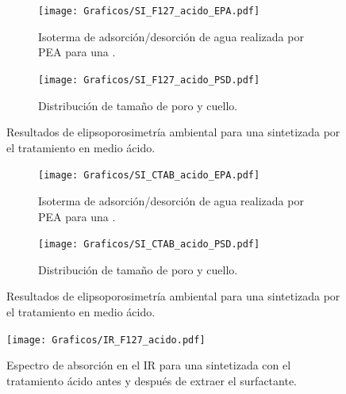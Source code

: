 
		    \begin{figure}[tbh!]
		  	\begin{subfigure}[t]{0.495\textwidth}
		  	\texttt{[image: Graficos/SI\_F127\_acido\_EPA.pdf]}
			\caption{Isoterma de adsorción/desorción de agua realizada por PEA para una \pdmF.}
			\label{fig:F127_acido_EPA}
			\end{subfigure}
			\begin{subfigure}[t]{0.495\textwidth}
		  	\texttt{[image: Graficos/SI\_F127\_acido\_PSD.pdf]}
			\caption{Distribución de tamaño de poro y cuello.\\ }
			\label{fig:F127_acido_PSD}
			\end{subfigure}
			\caption[Elipsoporosimetría \pdmF\space tratamiento ácido.]{Resultados de elipsoporosimetría ambiental para una \pdmF\space sintetizada por el tratamiento en medio ácido.}
			\end{figure}     

		
			\begin{figure}[tbh!]
		  	\begin{subfigure}[t]{0.495\textwidth}
		  	\texttt{[image: Graficos/SI\_CTAB\_acido\_EPA.pdf]}
			\caption[Elipsoporsimetría \pdmC\space tratamiento ácido.]{Isoterma de adsorción/desorción de agua realizada por PEA para una \pdmC.}
			\label{fig:CTAB_acido_EPA}
			\end{subfigure}
			\begin{subfigure}[t]{0.495\textwidth}
		  	\texttt{[image: Graficos/SI\_CTAB\_acido\_PSD.pdf]}
			\caption{Distribución de tamaño de poro y cuello.\\ }
			\label{fig:CTAB_acido_PSD}
			\end{subfigure}
			\caption[Elipsoporosimetría \pdmC\space tratamiento ácido.]{Resultados de elipsoporosimetría ambiental para una \pdmC\space sintetizada por el tratamiento en medio ácido.}
			\end{figure}

    		\begin{figure}[tbh!]
			\begin{center}
			\texttt{[image: Graficos/IR\_F127\_acido.pdf]}
			\caption[FTIR \pdmF\space tratamiento ácido.]{Espectro de absorción en el IR para una \pdmF\space sintetizada con el tratamiento ácido antes y después de extraer el surfactante.}
			\label{fig:IR_F127_acido}
			\end{center}
			\end{figure}
    	
